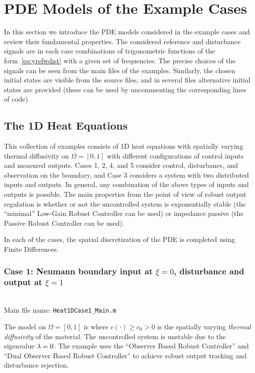 \documentclass[11pt, a4paper]{amsart}
\theoremstyle{definition}
\numberwithin{equation}{section}
\newcommand{\wdist}{w_{\mbox{\scriptsize\textit{dist}}}}
\begin{document}
\section{PDE Models of the Example Cases}
\label{sec:PDEcases}

In this section we introduce the PDE models considered in the example cases and review their fundamental properties.
The considered reference and disturbance signals are in each case combinations of trigonometric functions of the form~\eqref{eq:yrefwdist} with a given set of frequencies. The precise choices of the signals can be seen from the main files of the examples. Similarly, the chosen initial states are visible from the source files, and in several files alternative initial states are provided (these can be used by uncommenting the corresponding lines of code).

\subsection{The 1D Heat Equations}

This collection of examples consists of 1D heat equations with spatially varying thermal diffusivity on $\Omega = [0,1]$ with different configurations of control inputs and measured outputs. Cases 1, 2, 4, and 5 consider control, disturbance, and observation on the boundary, and Case 3 considers a system with two distributed inputs and outputs. In general, any combination of the above types of inputs and outputs is possible. 
The main properties from the point of view of robust output regulation is whether or not the uncontrolled system is exponentially stable (the ``minimal'' Low-Gain Robust Controller can be used) or impedance passive (the Passive Robust Controller can be used).

In each of the cases, the spatial discretization of the PDE is completed using Finite Differences.

\medskip

\subsubsection*{Case 1: Neumann boundary input at $\xi = 0$, disturbance and output at $\xi = 1$}
~\\[-1ex]

  \noindent Main file name: \texttt{Heat1DCase1\_Main.m}

\medskip

The model on $\Omega = [0,1]$ is
\eq{
  \pd{x}{t}(\xi,t) &=  \pdb{\xi}(c(\xi)\pd{x}{\xi})(\xi,t), \qquad x(\xi,0)=x_0(\xi) \\
      -\pd{x}{\xi}(0,t) &= u(t), \qquad 
      \pd{x}{\xi}(1,t) = \wdist(t), \\
      y(t) &= x(1,t),
    }
    where $c(\cdot)\geq c_0>0$ is the spatially varying \textit{thermal diffusivity} of the material.
    The uncontrolled system is unstable due to the eigenvalue $\lambda=0$. 
The example uses the ``Observer Based Robust Controller'' and ``Dual Observer Based Robust Controller'' to achieve robust output tracking and disturbance rejection.
\end{document}
